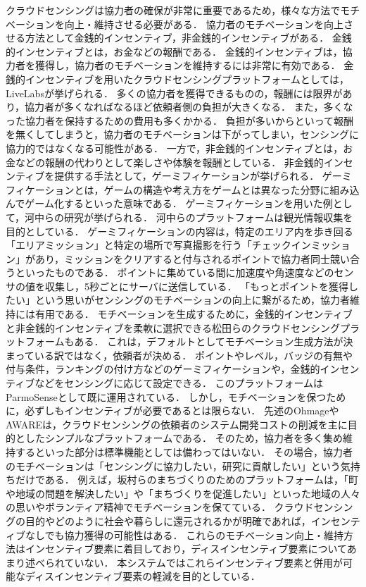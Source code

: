 クラウドセンシングは協力者の確保が非常に重要であるため，様々な方法でモチベーションを向上・維持させる必要がある．
協力者のモチベーションを向上させる方法として金銭的インセンティブ，非金銭的インセンティブがある．
金銭的インセンティブとは，お金などの報酬である．
金銭的インセンティブは，協力者を獲得し，協力者のモチベーションを維持するには非常に有効である．
金銭的インセンティブを用いたクラウドセンシングプラットフォームとしては，LiveLabs\cite{jaya}が挙げられる．
多くの協力者を獲得できるものの，報酬には限界があり，協力者が多くなればなるほど依頼者側の負担が大きくなる．
また，多くなった協力者を保持するための費用も多くかかる．
負担が多いからといって報酬を無くしてしまうと，協力者のモチベーションは下がってしまい，センシングに協力的ではなくなる可能性がある．
一方で，非金銭的インセンティブとは，お金などの報酬の代わりとして楽しさや体験を報酬としている．
非金銭的インセンティブを提供する手法として，ゲーミフィケーションが挙げられる\cite{ara}．
ゲーミフィケーションとは，ゲームの構造や考え方をゲームとは異なった分野に組み込んでゲーム化するといった意味である．
ゲーミフィケーションを用いた例として，河中らの研究\cite{kawa}が挙げられる．
河中らのプラットフォームは観光情報収集を目的としている．
ゲーミフィケーションの内容は，特定のエリア内を歩き回る「エリアミッション」と特定の場所で写真撮影を行う「チェックインミッション」があり，ミッションをクリアすると付与されるポイントで協力者同士競い合うといったものである．
ポイントに集めている間に加速度や角速度などのセンサの値を収集し，5秒ごとにサーバに送信している．
「もっとポイントを獲得したい」という思いがセンシングのモチベーションの向上に繋がるため，協力者維持には有用である．
モチベーションを生成するために，金銭的インセンティブと非金銭的インセンティブを柔軟に選択できる松田らのクラウドセンシングプラットフォーム\cite{matsu}もある．
これは，デフォルトとしてモチベーション生成方法が決まっている訳ではなく，依頼者が決める．
ポイントやレベル，バッジの有無や付与条件，ランキングの付け方などのゲーミフィケーションや，金銭的インセンティブなどをセンシングに応じて設定できる．
このプラットフォームはParmoSense\cite{Parmo}として既に運用されている．
しかし，モチベーションを保つために，必ずしもインセンティブが必要であるとは限らない．
先述のOhmageやAWAREは，クラウドセンシングの依頼者のシステム開発コストの削減を主に目的としたシンプルなプラットフォームである．
そのため，協力者を多く集め維持するといった部分は標準機能としては備わってはいない．
その場合，協力者のモチベーションは「センシングに協力したい，研究に貢献したい」という気持ちだけである．
例えば，坂村らのまちづくりのためのプラットフォーム\cite{mina}は，「町や地域の問題を解決したい」や「まちづくりを促進したい」といった地域の人々の思いやボランティア精神でモチベーションを保てている．
クラウドセンシングの目的やどのように社会や暮らしに還元されるかが明確であれば，インセンティブなしでも協力獲得の可能性はある．
これらのモチベーション向上・維持方法はインセンティブ要素に着目しており，ディスインセンティブ要素についてあまり述べられていない．
本システムではこれらインセンティブ要素と併用が可能なディスインセンティブ要素の軽減を目的としている．


